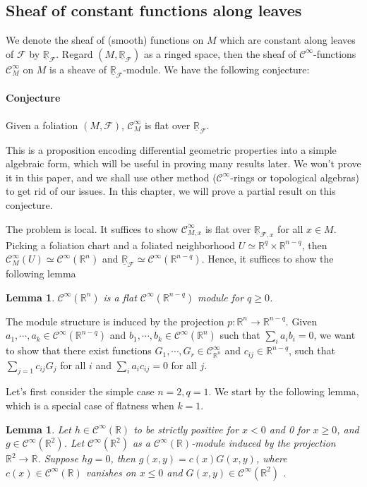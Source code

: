 \documentclass[12pt]{amsart}
\newtheorem{lem}[thm]{Lemma}
\theoremstyle{definition}
\theoremstyle{remark}
\numberwithin{equation}{section}
\newcommand{\CF}{{\mathcal F}}
\newcommand{\cinf}{{\mathcal C}^{\infty}}
\newcommand{\R}{{\mathbb{R}}}
\newcommand{\1}{{\mathbb{1}}}
\begin{document}
\subsection{Sheaf of constant functions along leaves}
We denote the sheaf of (smooth) functions on $M$ which are constant along leaves of $\CF$ by $\underline{\R}_{\CF}$. Regard $(M, \underline{\R}_{\CF})$ as a ringed space, then the sheaf of $\cinf$-functions $\cinf_M$ on $M$ is a sheave of $\underline{\R}_{\CF}$-module. We have the following conjecture:

	\paragraph{Conjecture} Given a foliation $(M, \CF)$, $\cinf_M$ is flat over $\underline{\R}_{\CF}$.
	
This is a proposition encoding differential geometric properties into a simple algebraic form, which will be useful in proving many results later. We won't prove it in this paper, and we shall use other method ($\cinf$-rings or topological algebras) to get rid of our issues. In this chapter, we will prove a partial result on this conjecture.


 The problem is local. It suffices to show $\cinf_{M,x}$ is flat over $\underline{\R}_{\CF, x}$ for all $x \in M$. Picking a foliation chart and a foliated neighborhood $ U \simeq \R^q \times \R^{n-q}$, then $\cinf_{M}(U)\simeq \cinf(\R^n)$ and $\underline{\R}_{\CF}\simeq \cinf(\R^{n-q})$. Hence, it suffices to show the following lemma
	\begin{lem}$ \cinf(\R^n)$ is a flat $ \cinf(\R^{n-q})$ module for $q\ge 0$.
	\end{lem}
The module structure is induced by the projection $p: \R^n \to \R^{n-q}$. Given $a_1, \cdots, a_k\in  \cinf(\R^{n-q})$ and  $b_1, \cdots, b_k\in  \cinf(\R^{n})$ such that $\sum_i a_ib_i = 0$, we want to show that there exist functions $G_1, \cdots, G_r \in \cinf_{\R^n}$ and $c_{ij}\in \R^{n-q}$, such that $\sum_{j=1}c_{ij}G_j$ for all $i$ and $\sum_i a_i c_{ij} = 0$ for all $j$.
	
	 Let's first consider the simple case $n=2, q=1$. We start by the following lemma, which is a special case of flatness when $k = 1$.
	 
	 \begin{lem}\label{lem1} Let $h\in \cinf(\R)$ to be strictly positive for $x<0$ and 0 for $x \ge 0$, and $g\in \cinf(\R^2)$. Let $\cinf(\R^2)$ as a $\cinf(\R)$-module induced by the projection $\R^2 \to \R$. Suppose $hg =0$, then $g(x,y) = c(x)G(x, y)$, where $c(x) \in \cinf(\R)$ vanishes on $x\le 0$ and $G(x,y) \in \cinf(\R^2)$ .
	 	\end{lem}
 	
\end{document}
